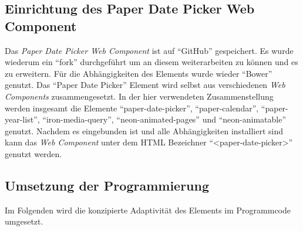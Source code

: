 \documentclass[12pt, paper=a4, bibtotoc, toc=listof, headsepline=true]{scrreprt}
\begin{document}
		\subsection{Einrichtung des Paper Date Picker Web Component}
		Das \emph{Paper Date Picker Web Component} ist auf \enquote{GitHub} gespeichert. Es wurde wiederum ein \enquote{fork} durchgeführt um an diesem weiterarbeiten zu können und es zu erweitern. Für die Abhängigkeiten des Elements wurde wieder \enquote{Bower} genutzt. Das \enquote{Paper Date Picker} Element wird selbst aus verschiedenen \emph{Web Components} zusammengesetzt. In der hier verwendeten Zusammenstellung werden insgesamt die Elemente \enquote{paper-date-picker}, \enquote{paper-calendar}, \enquote{paper-year-list}, \enquote{iron-media-query}, \enquote{neon-animated-pages} und \enquote{neon-animatable} genutzt. Nachdem es eingebunden ist und alle Abhängigkeiten installiert sind kann das \emph{Web Component} unter dem \ac{HTML} Bezeichner \enquote{<paper-date-picker>} genutzt werden.
		\subsection{Umsetzung der Programmierung}
		Im Folgenden wird die konzipierte Adaptivität des Elements im Programmcode umgesetzt. 
\end{document}

